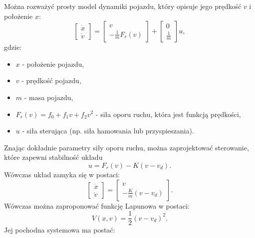 \documentclass{article}
\begin{document}
    Można rozważyć prosty model dynamiki pojazdu, który opisuje jego prędkość
    $v$ i położenie $x$:
    \begin{equation}
        \label{eq:acc_model}
        \begin{bmatrix}
            \dot{x}\\
            \dot{v}
        \end{bmatrix}
        =
        \begin{bmatrix}
            v\\
            -\frac{1}{m}F_{r}(v)
        \end{bmatrix}
        +
        \begin{bmatrix}
            0\\
            \frac{1}{m}
        \end{bmatrix}u,
    \end{equation}
    gdzie:
    \begin{itemize}
        \item $x$ - położenie pojazdu,
        \item $v$ - prędkość pojazdu,
        \item $m$ - masa pojazdu,
        \item $F_{r}(v) = f_{0} + f_{1}v + f_{2}v^{2}$ - siła oporu ruchu, która jest funkcją prędkości,
        \item $u$ - siła sterująca (np. siła hamowania lub przyspieszania).
    \end{itemize}
    Znając dokładnie parametry siły oporu ruchu, można zaprojektować sterowanie,
    które zapewni stabilność układu
    $$
        u = F_{r}(v) - K(v - v_{d}).
    $$
    Wówczas układ zamyka się w postaci:
    \begin{equation}
    \label{eq:acc_closed_loop}
        \begin{bmatrix}
            \dot{x}\\
            \dot{v}
        \end{bmatrix}
        =
        \begin{bmatrix}
            v\\
            -\frac{K}{m}(v - v_{d})
        \end{bmatrix}.
    \end{equation}
    Wówczas można zaproponować funkcję Lapunowa w postaci:
    \begin{equation}
    \label{eq:acc_v}
    V(x, v) = \frac{1}{2}(v - v_{d})^{2}.
    \end{equation}
    Jej pochodna systemowa ma postać:
\end{document}

